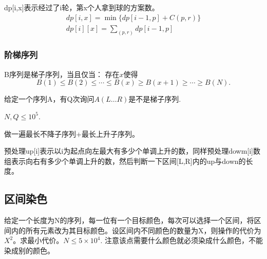 \documentclass{article}
\begin{document}
dp[i,x]表示经过了i轮，第x个人拿到球的方案数。
\begin{equation*}
    \begin{aligned}
        dp[i,x]=\min\{dp[i-1,p]+C(p,r)\}\\
        dp[i][x]=\sum_{(p,r)} dp[i-1,p]
    \end{aligned}
\end{equation*}
\subsubsection{阶梯序列}
B序列是梯子序列，当且仅当：
存在$x$使得
\begin{equation*}
    B(1)\le B(2)\le\cdots\le B(x)\ge B(x+1)\ge\cdots\ge B(N).
\end{equation*}

给定一个序列A，有Q次询问$A(L\ldots R)$是不是梯子序列.

$N,Q\le 10^5$.

做一遍最长不降子序列+最长上升子序列。

预处理up[i]表示以i为起点向左最大有多少个单调上升的数，同样预处理dowm[i]数组表示向右有多少个单调上升的数，然后判断一下区间[L,R]内的up与down的长度。

\subsection{区间染色}
给定一个长度为N的序列，每一位有一个目标颜色，每次可以选择一个区间，将区间内的所有元素改为其目标颜色。设区间内不同颜色的数量为X，则操作的代价为$X^2$。求最小代价。$N\le 5\times 10^4.$ 注意该点需要什么颜色就必须染成什么颜色，不能染成别的颜色。
\end{document}

